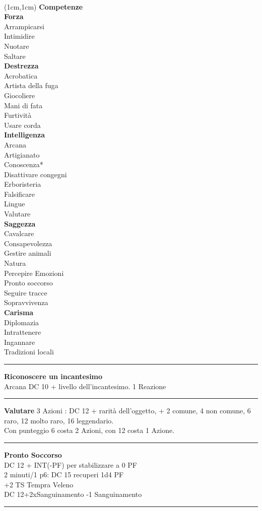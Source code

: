 \documentclass[a4paper,12 pt,openany]{book}
\newcommand{\riga}{\rule{\textwidth}{0.4pt}}
\begin{document}
~\newpage

\begin{textblock*}{4cm}(1cm,1cm) %
{\textbf{Competenze}\\
\textbf{Forza}\\
Arrampicarsi\\
Intimidire\\
Nuotare\\
Saltare	\\
\textbf{Destrezza}\\
Acrobatica\\
Artista della fuga\\
Giocoliere\\
Mani di fata\\
Furtività\\
Usare corda	\\
\textbf{Intelligenza}\\
Arcana\\
Artigianato\\
Conoscenza*\\
Disattivare congegni\\
Erboristeria\\
Falsificare\\
Lingue\\
Valutare\\
\textbf{Saggezza}\\
Cavalcare\\
Consapevolezza\\
Gestire animali\\
Natura\\
Percepire Emozioni\\
Pronto soccorso\\
Seguire tracce\\
Sopravvivenza\\
\textbf{Carisma}\\
Diplomazia\\
Intrattenere\\
Ingannare\\
Tradizioni locali
}

\riga

\textbf{Riconoscere un incantesimo}\\ Arcana DC 10 + livello dell'incantesimo. 1 Reazione

\riga

\textbf{Valutare} 3 Azioni : DC 12 + rarità dell'oggetto, + 2 comune, 4 non comune, 6 raro, 12 molto raro, 16 leggendario. \\
Con punteggio 6 costa 2 Azioni, con 12 costa 1 Azione.

\riga

\textbf{Pronto Soccorso}\\
DC 12 + INT(-PF) per stabilizzare a 0 PF\\
2 minuti/1 p6: DC 15 recuperi 1d4 PF\\
+2 TS Tempra Veleno\\
DC 12+2xSanguinamento -1 Sanguinamento
	
\riga

\end{textblock*}
\end{document}
